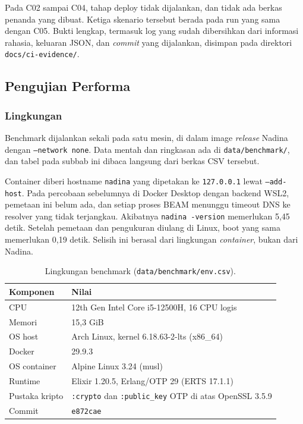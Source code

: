Pada C02 sampai C04, tahap deploy tidak dijalankan, dan tidak ada berkas penanda yang dibuat. Ketiga
skenario tersebut berada pada run yang sama dengan C05. Bukti lengkap, termasuk log yang sudah
dibersihkan dari informasi rahasia, keluaran JSON, dan \textit{commit} yang dijalankan, disimpan
pada direktori \texttt{docs/ci-evidence/}.

\subsection{Pengujian Performa}

\subsubsection*{Lingkungan}
Benchmark dijalankan sekali pada satu mesin, di dalam image \textit{release} Nadina dengan
\texttt{--network none}. Data mentah dan ringkasan ada di \texttt{data/benchmark/}, dan tabel
pada subbab ini dibaca langsung dari berkas CSV tersebut.

Container diberi hostname \texttt{nadina} yang dipetakan ke \texttt{127.0.0.1} lewat
\texttt{--add-host}. Pada percobaan sebelumnya di Docker Desktop dengan backend WSL2, pemetaan
ini belum ada, dan setiap proses BEAM menunggu timeout DNS ke resolver yang tidak terjangkau.
Akibatnya \texttt{nadina -version} memerlukan 5,45 detik. Setelah pemetaan dan pengukuran
diulang di Linux, boot yang sama memerlukan 0,19 detik. Selisih ini berasal dari lingkungan
\textit{container}, bukan dari Nadina.

\begin{table}[H]
\centering
\small
\begin{tabular}{@{}ll@{}}
\toprule
Komponen & Nilai \\
\midrule
CPU & 12th Gen Intel Core i5-12500H, 16 CPU logis \\
Memori & 15,3 GiB \\
OS host & Arch Linux, kernel 6.18.63-2-lts (x86\_64) \\
Docker & 29.9.3 \\
OS container & Alpine Linux 3.24 (musl) \\
Runtime & Elixir 1.20.5, Erlang/OTP 29 (ERTS 17.1.1) \\
Pustaka kripto & \texttt{:crypto} dan \texttt{:public\_key} OTP di atas OpenSSL 3.5.9 \\
Commit & \texttt{e872cae} \\
\bottomrule
\end{tabular}
\caption{Lingkungan benchmark (\texttt{data/benchmark/env.csv}).}
\end{table}

